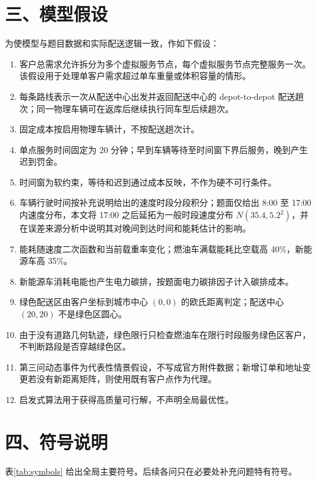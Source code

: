 \documentclass[UTF8,zihao=-4,a4paper]{ctexart}
\begin{document}
\section{三、模型假设}

为使模型与题目数据和实际配送逻辑一致，作如下假设：

\begin{enumerate}[leftmargin=2em,itemsep=0.2em]
\item 客户总需求允许拆分为多个虚拟服务节点，每个虚拟服务节点完整服务一次。该假设用于处理单客户需求超过单车重量或体积容量的情形。
\item 每条路线表示一次从配送中心出发并返回配送中心的 depot-to-depot 配送趟次；同一物理车辆可在返库后继续执行同车型后续趟次。
\item 固定成本按启用物理车辆计，不按配送趟次计。
\item 单点服务时间固定为 20 分钟；早到车辆等待至时间窗下界后服务，晚到产生迟到罚金。
\item 时间窗为软约束，等待和迟到通过成本反映，不作为硬不可行条件。
\item 车辆行驶时间按补充说明给出的速度时段分段积分；题面仅给出 8:00 至 17:00 内速度分布，本文将 17:00 之后延拓为一般时段速度分布 \(N(35.4,5.2^2)\)，并在误差来源分析中说明其对晚间到达时间和能耗估计的影响。
\item 能耗随速度二次函数和当前载重率变化；燃油车满载能耗比空载高 40\%，新能源车高 35\%。
\item 新能源车消耗电能也产生电力碳排，按题面电力碳排因子计入碳排成本。
\item 绿色配送区由客户坐标到城市中心 \((0,0)\) 的欧氏距离判定；配送中心 \((20,20)\) 不是绿色区圆心。
\item 由于没有道路几何轨迹，绿色限行只检查燃油车在限行时段服务绿色区客户，不判断路段是否穿越绿色区。
\item 第三问动态事件为代表性情景假设，不写成官方附件数据；新增订单和地址变更若没有新距离矩阵，则使用既有客户点作为代理。
\item 启发式算法用于获得高质量可行解，不声明全局最优性。
\end{enumerate}


\section{四、符号说明}

表\ref{tab:symbols} 给出全局主要符号。后续各问只在必要处补充问题特有符号。
\end{document}
